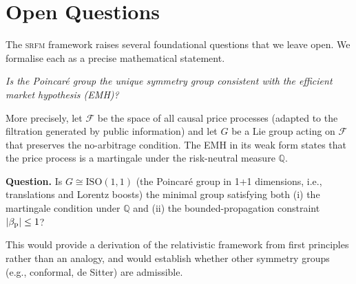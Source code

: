 \section{Open Questions}
\label{sec:openquestions}

The \textsc{srfm} framework raises several foundational questions that we leave
open.  We formalise each as a precise mathematical statement.

\begin{openquestion}
\label{oq:lorentz_unique}
\emph{Is the Poincaré group the unique symmetry group consistent with the
efficient market hypothesis (EMH)?}

More precisely, let $\mathcal{F}$ be the space of all causal price processes
(adapted to the filtration generated by public information) and let
$G$ be a Lie group acting on $\mathcal{F}$ that preserves the no-arbitrage
condition.  The EMH in its weak form states that the price process is a
martingale under the risk-neutral measure $\mathbb{Q}$.

\textbf{Question.} Is $G \cong \mathrm{ISO}(1,1)$ (the Poincaré group in
1+1 dimensions, i.e., translations and Lorentz boosts) the minimal group
satisfying both (i) the martingale condition under $\mathbb{Q}$ and (ii)
the bounded-propagation constraint $|\beta_{\mathrm{p}}| \leq 1$?

This would provide a derivation of the relativistic framework from
first principles rather than an analogy, and would establish whether
other symmetry groups (e.g., conformal, de Sitter) are admissible.
\end{openquestion}

